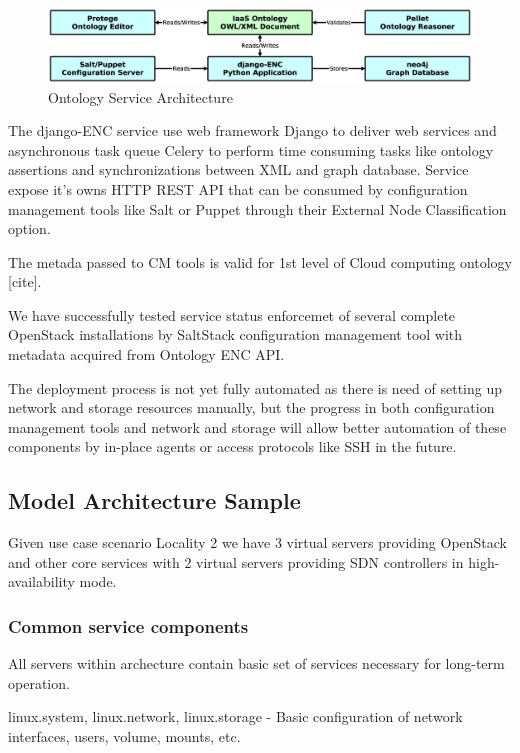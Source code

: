 \begin{figure}[!h]
\centering
\includegraphics[scale=.17]{img/django_enc_arch.eps}
\caption{Ontology Service Architecture}
\label{fig:cm}
\end{figure}

The django-ENC service  use  web framework Django to deliver web services and asynchronous task queue Celery to perform time consuming tasks like ontology assertions and synchronizations between XML and graph database. Service expose it's owns HTTP REST API that can be consumed by configuration management tools like Salt or Puppet through their External Node Classification option.

The metada passed to CM tools is valid for 1st level of Cloud computing ontology [cite].

We have successfully tested service status enforcemet of several complete OpenStack installations by SaltStack configuration management tool with metadata acquired from Ontology ENC API.

The deployment process is not yet fully automated as there is need of setting up network and storage resources manually, but the progress in both configuration management tools and network and storage will allow better automation of these components by in-place agents or access protocols like SSH in the future.

\subsection{Model Architecture Sample}

Given use case scenario Locality 2 we have 3 virtual servers providing OpenStack and other core services with 2 virtual servers providing SDN controllers in high-availability mode.

\subsubsection{Common service components}

All servers within archecture contain basic set of services necessary for long-term operation.

linux.system, linux.network, linux.storage - Basic configuration of network interfaces, users, volume, mounts, etc.

